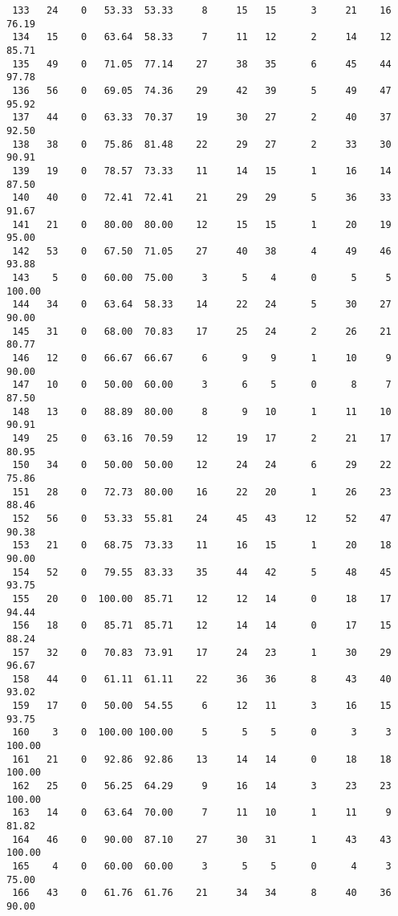\begin{verbatim}
 133   24    0   53.33  53.33     8     15   15      3     21    16    76.19
 134   15    0   63.64  58.33     7     11   12      2     14    12    85.71
 135   49    0   71.05  77.14    27     38   35      6     45    44    97.78
 136   56    0   69.05  74.36    29     42   39      5     49    47    95.92
 137   44    0   63.33  70.37    19     30   27      2     40    37    92.50
 138   38    0   75.86  81.48    22     29   27      2     33    30    90.91
 139   19    0   78.57  73.33    11     14   15      1     16    14    87.50
 140   40    0   72.41  72.41    21     29   29      5     36    33    91.67
 141   21    0   80.00  80.00    12     15   15      1     20    19    95.00
 142   53    0   67.50  71.05    27     40   38      4     49    46    93.88
 143    5    0   60.00  75.00     3      5    4      0      5     5   100.00
 144   34    0   63.64  58.33    14     22   24      5     30    27    90.00
 145   31    0   68.00  70.83    17     25   24      2     26    21    80.77
 146   12    0   66.67  66.67     6      9    9      1     10     9    90.00
 147   10    0   50.00  60.00     3      6    5      0      8     7    87.50
 148   13    0   88.89  80.00     8      9   10      1     11    10    90.91
 149   25    0   63.16  70.59    12     19   17      2     21    17    80.95
 150   34    0   50.00  50.00    12     24   24      6     29    22    75.86
 151   28    0   72.73  80.00    16     22   20      1     26    23    88.46
 152   56    0   53.33  55.81    24     45   43     12     52    47    90.38
 153   21    0   68.75  73.33    11     16   15      1     20    18    90.00
 154   52    0   79.55  83.33    35     44   42      5     48    45    93.75
 155   20    0  100.00  85.71    12     12   14      0     18    17    94.44
 156   18    0   85.71  85.71    12     14   14      0     17    15    88.24
 157   32    0   70.83  73.91    17     24   23      1     30    29    96.67
 158   44    0   61.11  61.11    22     36   36      8     43    40    93.02
 159   17    0   50.00  54.55     6     12   11      3     16    15    93.75
 160    3    0  100.00 100.00     5      5    5      0      3     3   100.00
 161   21    0   92.86  92.86    13     14   14      0     18    18   100.00
 162   25    0   56.25  64.29     9     16   14      3     23    23   100.00
 163   14    0   63.64  70.00     7     11   10      1     11     9    81.82
 164   46    0   90.00  87.10    27     30   31      1     43    43   100.00
 165    4    0   60.00  60.00     3      5    5      0      4     3    75.00
 166   43    0   61.76  61.76    21     34   34      8     40    36    90.00

\end{verbatim}
